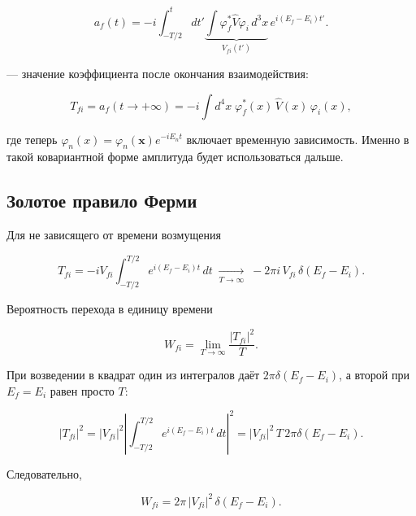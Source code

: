 \documentclass[../final.tex]{subfiles}
\begin{document}
\begin{equation*}
    a_f(t)
    =
    -i\int_{-T/2}^{t}dt'
    \underbrace{
        \int\varphi_f^*\hat V\varphi_i\,d^3x
    }_{V_{fi}(t')}
    \,e^{i(E_f-E_i)t'}.
\end{equation*}

 --- значение коэффициента после
окончания взаимодействия:

\begin{equation*}
    T_{fi}
    =
    a_f\!\left(t\to+\infty\right)
    =
    -i\int d^4x\;
    \varphi_f^*(x)\,\hat V(x)\,\varphi_i(x),
\end{equation*}

где теперь $\varphi_n(x)=\varphi_n(\mathbf x)e^{-iE_nt}$ включает
временную зависимость. Именно в такой ковариантной форме
амплитуда будет использоваться дальше.


\subsection{Золотое правило Ферми}

Для не зависящего от времени возмущения

\begin{equation*}
    T_{fi}
    =
    -iV_{fi}
    \int_{-T/2}^{T/2}
    e^{i(E_f-E_i)t}\,dt
    \;\xrightarrow[T\to\infty]{}\;
    -2\pi i\,V_{fi}\,\delta(E_f-E_i).
\end{equation*}

Вероятность перехода в единицу времени

\begin{equation*}
    W_{fi}
    =
    \lim_{T\to\infty}
    \frac{|T_{fi}|^2}{T}.
\end{equation*}

При возведении в квадрат один из интегралов даёт
$2\pi\delta(E_f-E_i)$, а второй при $E_f=E_i$ равен просто $T$:

\begin{equation*}
    |T_{fi}|^2
    =
    |V_{fi}|^2
    \left|
        \int_{-T/2}^{T/2}e^{i(E_f-E_i)t}\,dt
    \right|^2
    =
    |V_{fi}|^2\,
    T\,
    2\pi\delta(E_f-E_i).
\end{equation*}

Следовательно,

\begin{equation*}
    W_{fi}
    =
    2\pi\,|V_{fi}|^2\,\delta(E_f-E_i).
\end{equation*}
\end{document}
